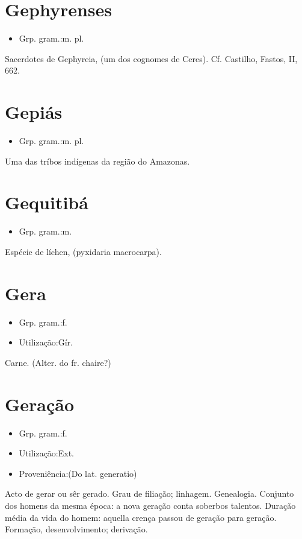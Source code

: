 \section{Gephyrenses}
\begin{itemize}
\item {Grp. gram.:m. pl.}
\end{itemize}
Sacerdotes de Gephyreia, (um dos cognomes de Ceres). Cf. Castilho, \textunderscore Fastos\textunderscore , II, 662.
\section{Gepiás}
\begin{itemize}
\item {Grp. gram.:m. pl.}
\end{itemize}
Uma das tríbos indígenas da região do Amazonas.
\section{Gequitibá}
\begin{itemize}
\item {Grp. gram.:m.}
\end{itemize}
Espécie de líchen, (\textunderscore pyxidaria macrocarpa\textunderscore ).
\section{Gera}
\begin{itemize}
\item {Grp. gram.:f.}
\end{itemize}
\begin{itemize}
\item {Utilização:Gír.}
\end{itemize}
Carne.
(Alter. do fr. \textunderscore chaire\textunderscore ?)
\section{Geração}
\begin{itemize}
\item {Grp. gram.:f.}
\end{itemize}
\begin{itemize}
\item {Utilização:Ext.}
\end{itemize}
\begin{itemize}
\item {Proveniência:(Do lat. \textunderscore generatio\textunderscore )}
\end{itemize}
Acto de gerar ou sêr gerado.
Grau de filiação; linhagem.
Genealogia.
Conjunto dos homens da mesma época: \textunderscore a nova geração conta soberbos talentos\textunderscore .
Duração média da vida do homem: \textunderscore aquella crença passou de geração para geração\textunderscore .
Formação, desenvolvimento; derivação.

